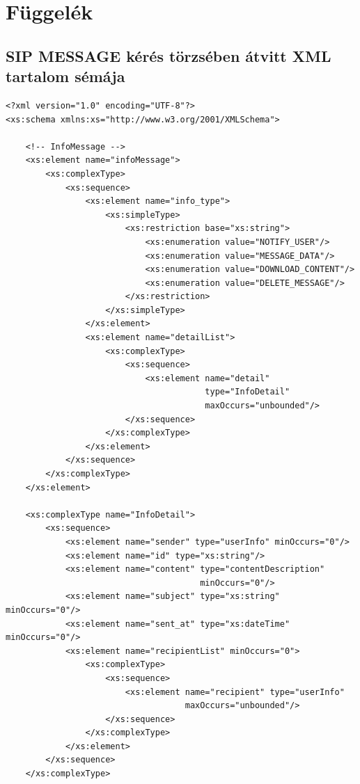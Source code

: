 
\appendix

\section{Függelék}
\label{sec:sip_message_xml_fuggelek}

\subsection{SIP MESSAGE kérés törzsében átvitt XML tartalom sémája}

\fontsize{10}{10}
\begin{verbatim}
<?xml version="1.0" encoding="UTF-8"?>
<xs:schema xmlns:xs="http://www.w3.org/2001/XMLSchema">

    <!-- InfoMessage -->
    <xs:element name="infoMessage">
        <xs:complexType>
            <xs:sequence>              
                <xs:element name="info_type">
                    <xs:simpleType>
                        <xs:restriction base="xs:string">
                            <xs:enumeration value="NOTIFY_USER"/>
                            <xs:enumeration value="MESSAGE_DATA"/>
                            <xs:enumeration value="DOWNLOAD_CONTENT"/>
                            <xs:enumeration value="DELETE_MESSAGE"/>
                        </xs:restriction>
                    </xs:simpleType>
                </xs:element>
                <xs:element name="detailList">
                    <xs:complexType>
                        <xs:sequence>
                            <xs:element name="detail" 
                                        type="InfoDetail" 
                                        maxOccurs="unbounded"/>
                        </xs:sequence>
                    </xs:complexType>
                </xs:element>
            </xs:sequence>
        </xs:complexType>
    </xs:element>

    <xs:complexType name="InfoDetail">
        <xs:sequence>
            <xs:element name="sender" type="userInfo" minOccurs="0"/>      
            <xs:element name="id" type="xs:string"/>
            <xs:element name="content" type="contentDescription" 
                                       minOccurs="0"/>
            <xs:element name="subject" type="xs:string" minOccurs="0"/>
            <xs:element name="sent_at" type="xs:dateTime" minOccurs="0"/>
            <xs:element name="recipientList" minOccurs="0">
                <xs:complexType>
                    <xs:sequence>
                        <xs:element name="recipient" type="userInfo" 
                                    maxOccurs="unbounded"/>
                    </xs:sequence>
                </xs:complexType>
            </xs:element>
        </xs:sequence>
    </xs:complexType>
    

\end{verbatim}
